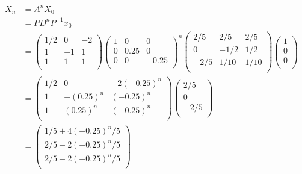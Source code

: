 \documentclass[12pt]{article}
\begin{document}
\begin{align*}
X_n &= A^n X_0\\
&=
P D^n P^{-1} x_0
\\
&=
\left( \begin{array}{ccc} 
1/2 & 0 & -2\\
1 & -1 & 1\\
1 & 1 & 1\\
\end{array} \right)
\left( \begin{array}{ccc} 
1 & 0 & 0\\
0 & 0.25 & 0\\
0 & 0 & -0.25\\
\end{array} \right)^n
\left( \begin{array}{ccc} 
2/5 & 2/5 & 2/5\\
0 & -1/2 & 1/2\\
-2/5 & 1/10 & 1/10\\
\end{array} \right)
\left( \begin{array}{c} 
1\\
0\\
0\\
\end{array} \right)\\
&=
\left( \begin{array}{ccc} 
1/2 & 0 & -2(-0.25)^n\\
1 & -(0.25)^n & (-0.25)^n\\
1 & (0.25)^n & (-0.25)^n\\
\end{array} \right)
\left( \begin{array}{ccc} 
2/5\\
0\\
-2/5\\
\end{array} \right)
\\
&=
\left( \begin{array}{ccc} 
1/5 + 4(-0.25)^n/5\\
2/5 - 2(-0.25)^n/5\\
2/5 - 2(-0.25)^n/5\\
\end{array} \right)
\\
\end{align*}
\filbreak
\end{document}
